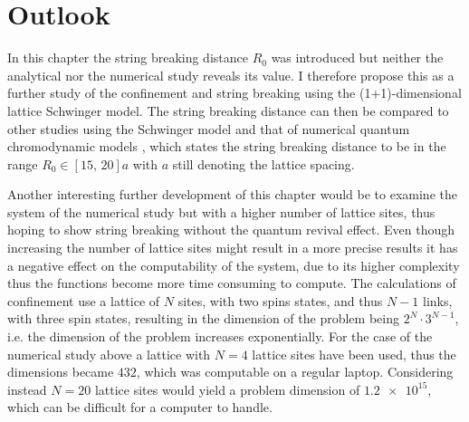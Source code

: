 \documentclass[../main.tex]{subfiles} %
\begin{document}
\section{Outlook} \label{sec:Outlook}

In this chapter the string breaking distance $R_0$ was introduced but neither the analytical nor the numerical study reveals its value. I therefore propose this as a further study of the confinement and string breaking using the (1+1)-dimensional lattice Schwinger model. The string breaking distance can then be compared to other studies using the Schwinger model \cite{buyens_confinementAndStringBreaking_2016} and that of numerical quantum chromodynamic models \cite{petkovic_stringBreakingAndQuarkConfinement_2018, bulava_stringBreakingByLightAndStrangeQuarksInQCD_2019}, which states the string breaking distance to be in the range $R_0 \in [15,\, 20]a$ with $a$ still denoting the lattice spacing.

Another interesting further development of this chapter would be to examine the system of the numerical study but with a higher number of lattice sites, thus hoping to show string breaking without the quantum revival effect. Even though increasing the number of lattice sites might result in a more precise results it has a negative effect on the computability of the system, due to its higher complexity thus the functions become more time consuming to compute. The calculations of confinement use a lattice of $N$ sites, with two spins states, and thus $N-1$ links, with three spin states, resulting in the dimension of the problem being $2^N \cdot 3^{N-1}$, i.e. the dimension of the problem increases exponentially. For the case of the numerical study above a lattice with $N=4$ lattice sites have been used, thus the dimensions became $432$, which was computable on a regular laptop. Considering instead $N=20$ lattice sites would yield a problem dimension of $\num{1.2e15}$, which can be difficult for a computer to handle.
\end{document}

